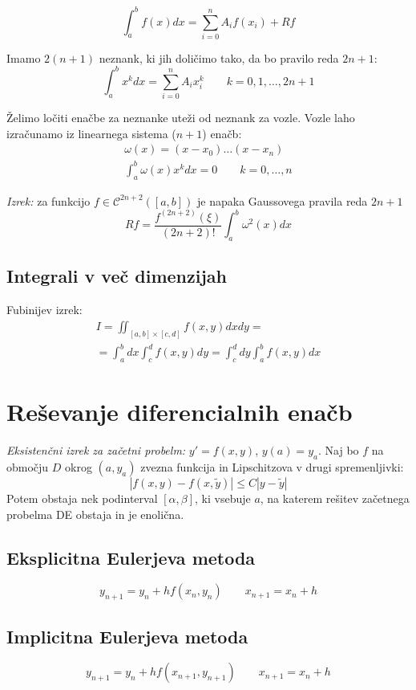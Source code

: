 \begin{multicols}{5}
\[ \int_a^b f(x) dx = \sum_{i=0}^n A_i f(x_i) + Rf \]

Imamo $2(n+1)$ neznank, ki jih doličimo tako, da bo pravilo reda $2n+1$:
\[ \int_a^b x^k dx = \sum_{i=0}^n A_i x_i^k \qquad k=0,1,\dots, 2n+1\]

Želimo ločiti enačbe za neznanke uteži od neznank za vozle. Vozle laho izračunamo iz linearnega sistema ($n+1$) enačb:
\begin{align*}
    \omega(x) = (x-x_0)\dots (x-x_n) \\
    \int_a^b \omega(x) x^k dx = 0 \qquad k = 0,\dots, n
\end{align*}

\textit{Izrek:} za funkcijo $f \in \mathcal{C}^{2n+2}([a,b])$ je napaka Gaussovega pravila reda $2n+1$
\[ Rf = \frac{f^{(2n+2)}(\xi)}{(2n+2)!} \int_a^b \omega^2(x) dx \]

\subsection*{Integrali v več dimenzijah}
Fubinijev izrek:
\begin{multline*}
    I = \iint_{[a,b]\times [c,d]} f(x, y) dx dy = \\ 
    = \int_a^b dx \int_c^d f(x,y) dy = \int_c^d dy \int_a^b f(x, y) dx
\end{multline*}


\section*{Reševanje diferencialnih enačb}


\textit{Eksistenčni izrek za začetni probelm:} $y' = f(x,y)$, $y(a) = y_a$. Naj bo $f$
na območju $D$ okrog $(a, y_a)$ zvezna funkcija in Lipschitzova v drugi spremenljivki:
\[ |f(x,y) - f(x, \tilde{y}) | \leq C |y-\tilde{y}| \]
Potem obstaja nek podinterval $[\alpha, \beta]$, ki vsebuje $a$, na katerem rešitev
začetnega probelma DE obstaja in je enolična.
%

\subsection*{Eksplicitna Eulerjeva metoda}
\[ y_{n+1} = y_n + h f(x_n, y_n) \qquad x_{n+1} = x_n + h\]

\subsection*{Implicitna Eulerjeva metoda}
\[ y_{n+1} = y_n + hf(x_{n+1}, y_{n+1}) \qquad x_{n+1} = x_n + h\]


\end{multicols}
